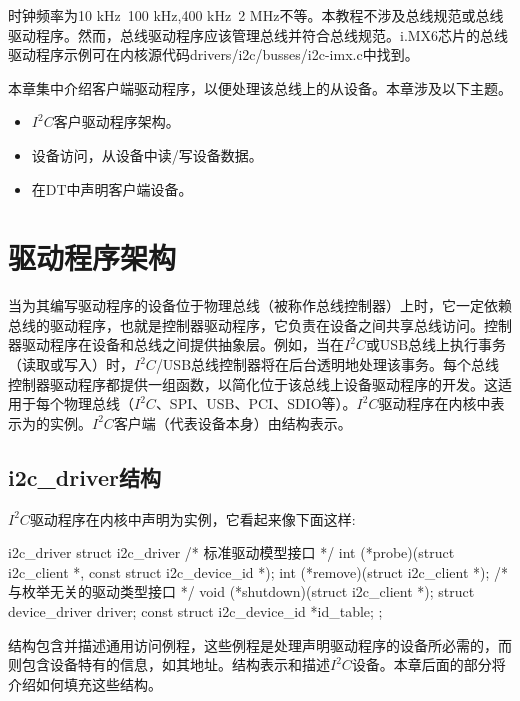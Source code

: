 \documentclass[lang=cn,newtx,10pt,scheme=chinese]{elegantbook}
\begin{document}
时钟频率为10 kHz~100 kHz,400 kHz~2 MHz不等。本教程不涉及总线规范或总线驱动程序。然而，总线驱动程序应该管理总线并符合总线规范。i.MX6芯片的总线驱动程序示例可在内核源代码drivers/i2c/busses/i2c-imx.c中找到。

本章集中介绍客户端驱动程序，以便处理该总线上的从设备。本章涉及以下主题。

\begin{itemize}
\item $I^2C$客户驱动程序架构。
\item 设备访问，从设备中读/写设备数据。
\item 在DT中声明客户端设备。
\end{itemize}

\section{驱动程序架构}

当为其编写驱动程序的设备位于物理总线（被称作总线控制器）上时，它一定依赖总线的驱动程序，也就是控制器驱动程序，它负责在设备之间共享总线访问。控制器驱动程序在设备和总线之间提供抽象层。例如，当在$I^2C$或USB总线上执行事务（读取或写入）时，$I^2C$/USB总线控制器将在后台透明地处理该事务。每个总线控制器驱动程序都提供一组函数，以简化位于该总线上设备驱动程序的开发。这适用于每个物理总线（$I^2C$、SPI、USB、PCI、SDIO等）。$I^2C$驱动程序在内核中表示为的实例。$I^2C$客户端（代表设备本身）由结构表示。

\subsection{i2c\_driver结构}

$I^2C$驱动程序在内核中声明为实例，它看起来像下面这样:

\begin{mycode}{i2c\_driver}
struct i2c_driver {
    /* 标准驱动模型接口 */
    int (*probe)(struct i2c_client *, const struct i2c_device_id *);
    int (*remove)(struct i2c_client *);
    /* 与枚举无关的驱动类型接口 */
    void (*shutdown)(struct i2c_client *);
    struct device_driver driver;
    const struct i2c_device_id *id_table;
};
\end{mycode}

结构包含并描述通用访问例程，这些例程是处理声明驱动程序的设备所必需的，而则包含设备特有的信息，如其地址。结构表示和描述$I^2C$设备。本章后面的部分将介绍如何填充这些结构。
\end{document}
